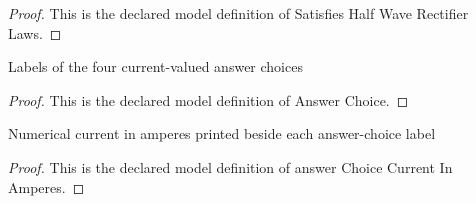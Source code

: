 \begin{proof}
  This is the declared model definition of Satisfies Half Wave Rectifier Laws.
\end{proof}
\begin{definition}
  \label{def:physics:phyx-mini-0629:phyxminiproblems-problemphyxmini0629-answerchoice}
  Labels of the four current-valued answer choices
\end{definition}
\begin{proof}
  This is the declared model definition of Answer Choice.
\end{proof}
\begin{definition}
  \label{def:physics:phyx-mini-0629:phyxminiproblems-problemphyxmini0629-answerchoicecurrentinamperes}
  Numerical current in amperes printed beside each answer-choice label
\end{definition}
\begin{proof}
  This is the declared model definition of answer Choice Current In Amperes.
\end{proof}
